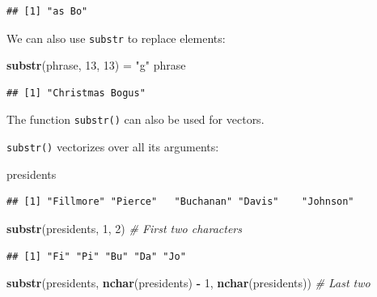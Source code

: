 \documentclass[
]{book}
\newenvironment{Shaded}{\begin{snugshade}}{\end{snugshade}}
\newcommand{\CommentTok}[1]{\textcolor[rgb]{0.56,0.35,0.01}{\textit{#1}}}
\newcommand{\DecValTok}[1]{\textcolor[rgb]{0.00,0.00,0.81}{#1}}
\newcommand{\KeywordTok}[1]{\textcolor[rgb]{0.13,0.29,0.53}{\textbf{#1}}}
\newcommand{\NormalTok}[1]{#1}
\newcommand{\OperatorTok}[1]{\textcolor[rgb]{0.81,0.36,0.00}{\textbf{#1}}}
\newcommand{\StringTok}[1]{\textcolor[rgb]{0.31,0.60,0.02}{#1}}
\begin{document}
\begin{verbatim}
## [1] "as Bo"
\end{verbatim}

We can also use \texttt{substr} to replace elements:

\begin{Shaded}
\begin{Highlighting}[]
\KeywordTok{substr}\NormalTok{(phrase, }\DecValTok{13}\NormalTok{, }\DecValTok{13}\NormalTok{) =}\StringTok{ "g"}
\NormalTok{phrase}
\end{Highlighting}
\end{Shaded}

\begin{verbatim}
## [1] "Christmas Bogus"
\end{verbatim}

The function \texttt{substr()} can also be used for vectors.

\texttt{substr()} vectorizes over all its arguments:

\begin{Shaded}
\begin{Highlighting}[]
\NormalTok{presidents}
\end{Highlighting}
\end{Shaded}

\begin{verbatim}
## [1] "Fillmore" "Pierce"   "Buchanan" "Davis"    "Johnson"
\end{verbatim}

\begin{Shaded}
\begin{Highlighting}[]
\KeywordTok{substr}\NormalTok{(presidents, }\DecValTok{1}\NormalTok{, }\DecValTok{2}\NormalTok{)  }\CommentTok{# First two characters}
\end{Highlighting}
\end{Shaded}

\begin{verbatim}
## [1] "Fi" "Pi" "Bu" "Da" "Jo"
\end{verbatim}

\begin{Shaded}
\begin{Highlighting}[]
\KeywordTok{substr}\NormalTok{(presidents, }\KeywordTok{nchar}\NormalTok{(presidents) }\OperatorTok{-}\StringTok{ }\DecValTok{1}\NormalTok{, }\KeywordTok{nchar}\NormalTok{(presidents))  }\CommentTok{# Last two}
\end{Highlighting}
\end{Shaded}
\end{document}
